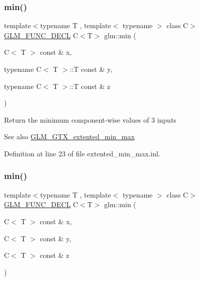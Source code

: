 \subsubsection{\texorpdfstring{min()}{min()}\hspace{0.1cm}{\footnotesize\ttfamily [2/6]}}
{\footnotesize\ttfamily template$<$typename T , template$<$ typename $>$ class C$>$ \\
\hyperlink{setup_8hpp_ab2d052de21a70539923e9bcbf6e83a51}{G\+L\+M\+\_\+\+F\+U\+N\+C\+\_\+\+D\+E\+CL} C$<$T$>$ glm\+::min (\begin{DoxyParamCaption}\item[{C$<$ T $>$ const \&}]{x,  }\item[{typename C$<$ T $>$\+::T const \&}]{y,  }\item[{typename C$<$ T $>$\+::T const \&}]{z }\end{DoxyParamCaption})}

Return the minimum component-\/wise values of 3 inputs \begin{DoxySeeAlso}{See also}
\hyperlink{group__gtx__extented__min__max}{G\+L\+M\+\_\+\+G\+T\+X\+\_\+extented\+\_\+min\+\_\+max} 
\end{DoxySeeAlso}


Definition at line 23 of file extented\+\_\+min\+\_\+max.\+inl.

\mbox{\label{group__gtx__extented__min__max_ga42b5c3fc027fd3d9a50d2ccc9126d9f0}} 
\subsubsection{\texorpdfstring{min()}{min()}\hspace{0.1cm}{\footnotesize\ttfamily [3/6]}}
{\footnotesize\ttfamily template$<$typename T , template$<$ typename $>$ class C$>$ \\
\hyperlink{setup_8hpp_ab2d052de21a70539923e9bcbf6e83a51}{G\+L\+M\+\_\+\+F\+U\+N\+C\+\_\+\+D\+E\+CL} C$<$T$>$ glm\+::min (\begin{DoxyParamCaption}\item[{C$<$ T $>$ const \&}]{x,  }\item[{C$<$ T $>$ const \&}]{y,  }\item[{C$<$ T $>$ const \&}]{z }\end{DoxyParamCaption})}

